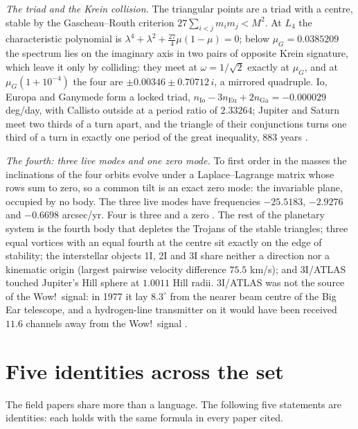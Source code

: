 \documentclass[11pt]{article}
\theoremstyle{definition}\newtheorem{definition}[theorem]{Definition}
\theoremstyle{remark}\newtheorem{remark}[theorem]{Remark}
\begin{document}
\emph{The triad and the Krein collision.} The triangular points are a triad with a centre, stable by the Gascheau--Routh criterion $27\sum_{i<j}m_im_j<M^2$. At $L_4$ the characteristic polynomial is $\lambda^4+\lambda^2+\frac{27}4\mu(1-\mu)=0$; below $\mu_G=0.0385209$ the spectrum lies on the imaginary axis in two pairs of opposite Krein signature, which leave it only by colliding: they meet at $\omega=1/\sqrt2$ exactly at $\mu_G$, and at $\mu_G(1+10^{-4})$ the four are $\pm0.00346\pm0.70712\,i$, a mirrored quadruple. Io, Europa and Ganymede form a locked triad, $n_{\mathrm{Io}}-3n_{\mathrm{Eu}}+2n_{\mathrm{Ga}}=-0.000029$ deg/day, with Callisto outside at a period ratio of $2.33264$; Jupiter and Saturn meet two thirds of a turn apart, and the triangle of their conjunctions turns one third of a turn in exactly one period of the great inequality, $883$ years \cite{SPlanet}.

\emph{The fourth: three live modes and one zero mode.} To first order in the masses the inclinations of the four orbits evolve under a Laplace--Lagrange matrix whose rows sum to zero, so a common tilt is an exact zero mode: the invariable plane, occupied by no body. The three live modes have frequencies $-25.5183$, $-2.9276$ and $-0.6698$ arcsec/yr. Four is three and a zero \cite{SPlanet}. The rest of the planetary system is the fourth body that depletes the Trojans of the stable triangles; three equal vortices with an equal fourth at the centre sit exactly on the edge of stability; the interstellar objects 1I, 2I and 3I share neither a direction nor a kinematic origin (largest pairwise velocity difference $75.5$ km/s); and 3I/ATLAS touched Jupiter's Hill sphere at $1.0011$ Hill radii. 3I/ATLAS was not the source of the Wow!\ signal: in 1977 it lay $8.3^\circ$ from the nearer beam centre of the Big Ear telescope, and a hydrogen-line transmitter on it would have been received $11.6$ channels away from the Wow!\ signal \cite{SPlanet}.

\section{Five identities across the set}\label{sec:together}
The field papers share more than a language. The following five statements are identities: each holds with the same formula in every paper cited.
\end{document}
